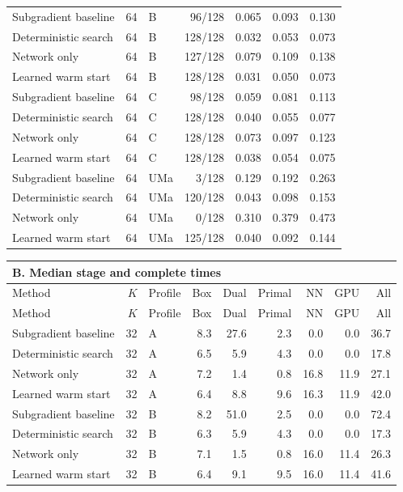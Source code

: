 \begin{longtable}{lrlrrrr}
Subgradient baseline & 64 & B & 96/128 & 0.065 & 0.093 & 0.130\\
Deterministic search & 64 & B & 128/128 & 0.032 & 0.053 & 0.073\\
Network only & 64 & B & 127/128 & 0.079 & 0.109 & 0.138\\
Learned warm start & 64 & B & 128/128 & 0.031 & 0.050 & 0.073\\
Subgradient baseline & 64 & C & 98/128 & 0.059 & 0.081 & 0.113\\
Deterministic search & 64 & C & 128/128 & 0.040 & 0.055 & 0.077\\
Network only & 64 & C & 128/128 & 0.073 & 0.097 & 0.123\\
Learned warm start & 64 & C & 128/128 & 0.038 & 0.054 & 0.075\\
Subgradient baseline & 64 & UMa & 3/128 & 0.129 & 0.192 & 0.263\\
Deterministic search & 64 & UMa & 120/128 & 0.043 & 0.098 & 0.153\\
Network only & 64 & UMa & 0/128 & 0.310 & 0.379 & 0.473\\
Learned warm start & 64 & UMa & 125/128 & 0.040 & 0.092 & 0.144\\\end{longtable}\addtocounter{table}{-1}\renewcommand{\theHtable}{\arabic{table}B}\begin{longtable}{lrlrrrrrr}\multicolumn{9}{l}{\textbf{B. Median stage and complete times}}\\\toprule Method & $K$ & Profile & Box & Dual & Primal & NN & GPU & All\\\midrule\endfirsthead\toprule Method & $K$ & Profile & Box & Dual & Primal & NN & GPU & All\\\midrule\endhead\bottomrule\endfoot
Subgradient baseline & 32 & A & 8.3 & 27.6 & 2.3 & 0.0 & 0.0 & 36.7\\
Deterministic search & 32 & A & 6.5 & 5.9 & 4.3 & 0.0 & 0.0 & 17.8\\
Network only & 32 & A & 7.2 & 1.4 & 0.8 & 16.8 & 11.9 & 27.1\\
Learned warm start & 32 & A & 6.4 & 8.8 & 9.6 & 16.3 & 11.9 & 42.0\\
Subgradient baseline & 32 & B & 8.2 & 51.0 & 2.5 & 0.0 & 0.0 & 72.4\\
Deterministic search & 32 & B & 6.3 & 5.9 & 4.3 & 0.0 & 0.0 & 17.3\\
Network only & 32 & B & 7.1 & 1.5 & 0.8 & 16.0 & 11.4 & 26.3\\
Learned warm start & 32 & B & 6.4 & 9.1 & 9.5 & 16.0 & 11.4 & 41.6\\

\end{longtable}
